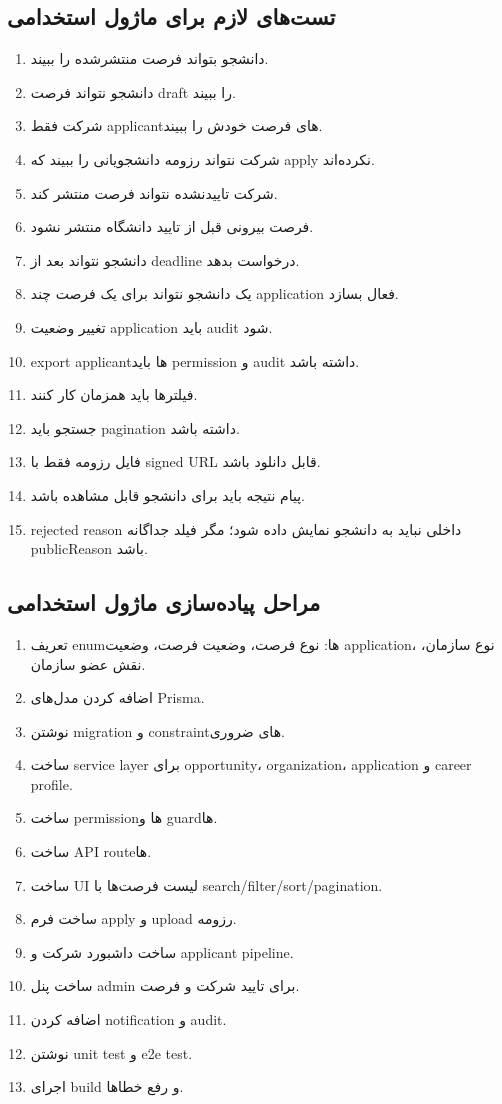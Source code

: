 \documentclass[12pt,a4paper]{article}
\begin{document}
\subsection{تست‌های لازم برای ماژول استخدامی}
\begin{enumerate}
\item دانشجو بتواند فرصت منتشرشده را ببیند.
\item دانشجو نتواند فرصت draft را ببیند.
\item شرکت فقط applicantهای فرصت خودش را ببیند.
\item شرکت نتواند رزومه دانشجویانی را ببیند که apply نکرده‌اند.
\item شرکت تاییدنشده نتواند فرصت منتشر کند.
\item فرصت بیرونی قبل از تایید دانشگاه منتشر نشود.
\item دانشجو نتواند بعد از deadline درخواست بدهد.
\item یک دانشجو نتواند برای یک فرصت چند application فعال بسازد.
\item تغییر وضعیت application باید audit شود.
\item export applicantها باید permission و audit داشته باشد.
\item فیلترها باید همزمان کار کنند.
\item جستجو باید pagination داشته باشد.
\item فایل رزومه فقط با signed URL قابل دانلود باشد.
\item پیام نتیجه باید برای دانشجو قابل مشاهده باشد.
\item rejected reason داخلی نباید به دانشجو نمایش داده شود؛ مگر فیلد جداگانه publicReason باشد.
\end{enumerate}

\subsection{مراحل پیاده‌سازی ماژول استخدامی}
\begin{enumerate}
\item تعریف enumها: نوع فرصت، وضعیت فرصت، وضعیت application، نوع سازمان، نقش عضو سازمان.
\item اضافه کردن مدل‌های Prisma.
\item نوشتن migration و constraintهای ضروری.
\item ساخت service layer برای opportunity، organization، application و career profile.
\item ساخت permissionها و guardها.
\item ساخت API routeها.
\item ساخت UI لیست فرصت‌ها با search/filter/sort/pagination.
\item ساخت فرم apply و upload رزومه.
\item ساخت داشبورد شرکت و applicant pipeline.
\item ساخت پنل admin برای تایید شرکت و فرصت.
\item اضافه کردن notification و audit.
\item نوشتن unit test و e2e test.
\item اجرای build و رفع خطاها.
\end{enumerate}
\end{document}
